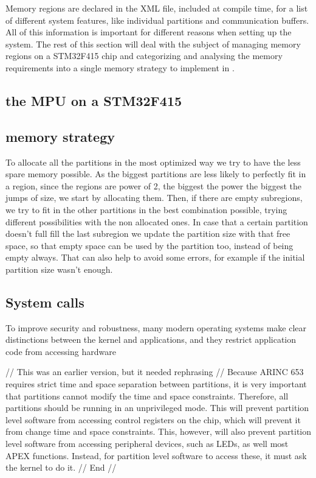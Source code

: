 Memory regions are declared in the XML file, included at compile time, for a list
of different system features, like individual partitions and communication buffers.
All of this information is important for different reasons when setting up the system.
The rest of this section will deal with the subject of managing memory regions on a STM32F415 chip
and categorizing and analysing the memory requirements into a single memory strategy to implement in
.

\subsection{the MPU on a STM32F415}



\subsection{memory strategy}
To allocate all the partitions in the most optimized way we try to have the less spare memory possible. As
 the biggest partitions are less likely to perfectly fit in a region, since the regions are power of 2,
  the biggest the power the biggest the jumps of size, we start by allocating them. Then, if there are
   empty subregions, we try to fit in the other partitions in the best combination possible, trying
    different possibilities with the non allocated ones. In case that a certain partition doesn't full
    fill the last subregion we update the partition size with that free space, so that empty space can be
    used by the partition too, instead of being empty always. That can also help to avoid some errors, 
    for example if the initial partition size wasn't enough.



\subsection{System calls}
To improve security and robustness, many modern operating systems make clear 
distinctions between the kernel and applications, and they restrict application
code from accessing hardware 

// This was an earlier version, but it needed rephrasing //
Because ARINC 653 requires strict time and space separation between partitions,
it is very important that partitions cannot modify the time and space constraints.
Therefore, all partitions should be running in an unprivileged mode.
This will prevent partition level software from accessing control registers on
the chip, which will prevent it from change time and space constraints.
This, however, will also prevent partition level software from accessing
peripheral devices, such as LEDs, as well most APEX functions.
Instead, for partition level software to access these, it must ask the kernel to
do it. 
// End //


